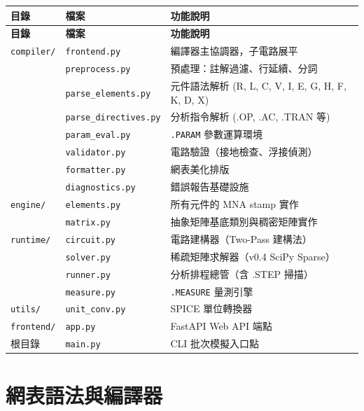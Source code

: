 \documentclass[12pt,a4paper]{article}
\begin{document}
\begin{longtable}{lll}
\toprule
\textbf{目錄} & \textbf{檔案} & \textbf{功能說明} \\
\midrule
\endfirsthead
\toprule
\textbf{目錄} & \textbf{檔案} & \textbf{功能說明} \\
\midrule
\endhead
\texttt{compiler/} & \texttt{frontend.py}  & 編譯器主協調器，子電路展平 \\
                    & \texttt{preprocess.py} & 預處理：註解過濾、行延續、分詞 \\
                    & \texttt{parse\_elements.py}   & 元件語法解析 (R, L, C, V, I, E, G, H, F, K, D, X) \\
                    & \texttt{parse\_directives.py}  & 分析指令解析 (.OP, .AC, .TRAN 等) \\
                    & \texttt{param\_eval.py}  & \texttt{.PARAM} 參數運算環境 \\
                    & \texttt{validator.py}    & 電路驗證（接地檢查、浮接偵測）\\
                    & \texttt{formatter.py}    & 網表美化排版 \\
                    & \texttt{diagnostics.py}  & 錯誤報告基礎設施 \\
\midrule
\texttt{engine/}   & \texttt{elements.py}     & 所有元件的 MNA stamp 實作 \\
                    & \texttt{matrix.py}       & 抽象矩陣基底類別與稠密矩陣實作 \\
\midrule
\texttt{runtime/}  & \texttt{circuit.py}      & 電路建構器（Two-Pass 建構法）\\
                    & \texttt{solver.py}       & 稀疏矩陣求解器（v0.4 SciPy Sparse）\\
                    & \texttt{runner.py}       & 分析排程總管（含 .STEP 掃描）\\
                    & \texttt{measure.py}      & \texttt{.MEASURE} 量測引擎 \\
\midrule
\texttt{utils/}    & \texttt{unit\_conv.py}   & SPICE 單位轉換器 \\
\midrule
\texttt{frontend/} & \texttt{app.py}          & FastAPI Web API 端點 \\
\midrule
根目錄              & \texttt{main.py}         & CLI 批次模擬入口點 \\
\bottomrule
\end{longtable}


\section{網表語法與編譯器}
\end{document}
